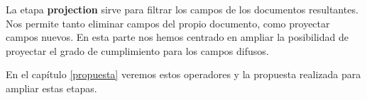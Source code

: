 La etapa \textbf{projection} sirve para filtrar los campos de los documentos resultantes. Nos permite tanto eliminar campos del propio documento, como proyectar campos nuevos. En esta parte nos hemos centrado en ampliar la posibilidad de proyectar el grado de cumplimiento para los campos difusos.

En el capítulo \ref{propuesta} veremos estos operadores y la propuesta realizada para ampliar estas etapas.

